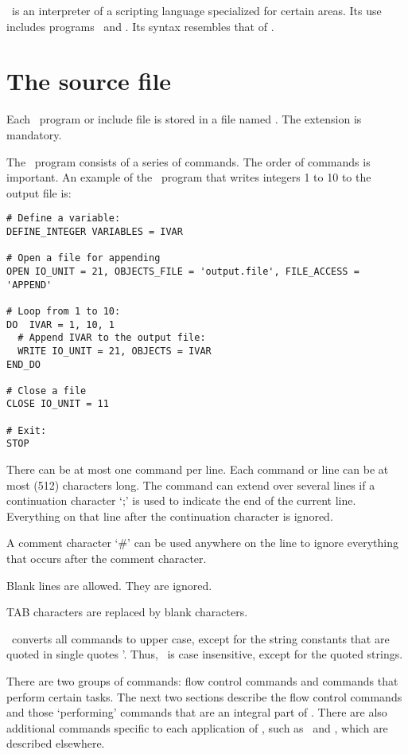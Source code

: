 \TOP\ is an interpreter of a scripting language specialized for certain
areas. Its use includes programs \MODELLER\ and \ASGL. Its syntax resembles 
that of \FORTRAN.


\section{The source file}

\label{SECTION:topsource}

Each \TOP\ program or include file is stored in a file named . 
The  extension is mandatory.

The \TOP\ program consists of a series of commands. The order of
commands is important. An example of the \TOP\ program that
writes integers 1 to 10 to the output file is:

\begin{verbatim}
# Define a variable:
DEFINE_INTEGER VARIABLES = IVAR

# Open a file for appending
OPEN IO_UNIT = 21, OBJECTS_FILE = 'output.file', FILE_ACCESS = 'APPEND'

# Loop from 1 to 10:
DO  IVAR = 1, 10, 1
  # Append IVAR to the output file:
  WRITE IO_UNIT = 21, OBJECTS = IVAR
END_DO

# Close a file
CLOSE IO_UNIT = 11

# Exit:
STOP
\end{verbatim}


There can be at most one command per line. Each command or line can be
at most  (512) characters long.  The command can extend
over several lines if a continuation character `;' is used to indicate 
the end of the current line.  Everything on that line after the 
continuation character is ignored.

A comment character `\#' can be used anywhere on the line to ignore
everything that occurs after the comment character.

Blank lines are allowed. They are ignored. 

TAB characters are replaced by blank characters.

\TOP\ converts all commands to upper case, except for the string 
constants that are quoted in single quotes '. Thus, \TOP\ is case
insensitive, except for the quoted strings.

There are two groups of commands: flow control commands and commands that 
perform certain tasks. The next two sections describe the flow control 
commands and those `performing' commands that are an integral part of \TOP.  
There are also additional commands specific to each application of \TOP, 
such as \MODELLER\ and \ASGL, which are described elsewhere. 

